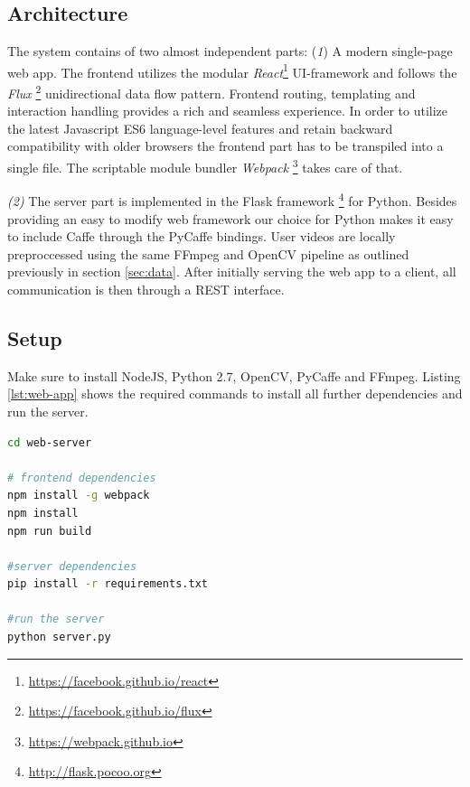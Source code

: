 
\subsection{Architecture}
The system contains of two almost independent parts:
(\textit{1}) A modern single-page web app.
The frontend utilizes the modular \textit{React}\footnote{\url{https://facebook.github.io/react}} UI-framework and follows the \textit{Flux} \footnote{\url{https://facebook.github.io/flux}} unidirectional data flow pattern.
Frontend routing, templating and interaction handling provides a rich and seamless experience.
In order to utilize the latest Javascript ES6 language-level features and retain backward compatibility with older browsers the frontend part has to be transpiled into a single file.
The scriptable module bundler \textit{Webpack} \footnote{\url{https://webpack.github.io}} takes care of that.

\textit{(2)} The server part is implemented in the Flask framework \footnote{\url{http://flask.pocoo.org}} for Python.
Besides providing an easy to modify web framework our choice for Python makes it easy to include Caffe through the PyCaffe bindings.
User videos are locally preproccessed using the same FFmpeg and OpenCV pipeline as outlined previously in section \ref{sec:data}.
After initially serving the web app to a client, all communication is then through a REST interface.

\subsection{Setup}
Make sure to install NodeJS, Python 2.7, OpenCV, PyCaffe and FFmpeg.
Listing \ref{lst:web-app} shows the required commands to install all further dependencies and run the server.

\begin{lstlisting}[language=sh, caption=Web Application Setup, label=lst:web-app]
cd web-server

# frontend dependencies
npm install -g webpack
npm install
npm run build

#server dependencies
pip install -r requirements.txt

#run the server
python server.py
\end{lstlisting}